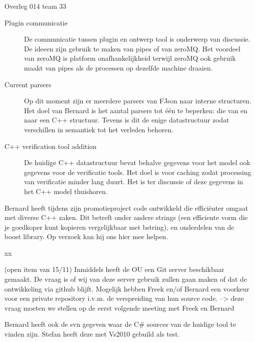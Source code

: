 \documentclass[a4paper,final]{article}
\begin{document}
\begin{Minutes}{Overleg 014 team 33}
\begin{description}
	\item[Plugin communicatie] De communicatie tussen plugin en ontwerp tool
		is onderwerp van discussie. De ideeen zijn gebruik te maken van pipes 
		of van zeroMQ. Het voordeel van zeroMQ is platform onafhankelijkheid
		terwijl zeroMQ ook gebruik maakt van pipes als de processen op dezelfde
		machine draaien.
	
	\item[Current parsers] Op dit moment zijn er meerdere parsers van FJson
		naar interne structuren. Het doel van Bernard is het aantal parsers tot
		\'e\'en te beperken: die van en naar een C++ structuur. Tevens is dit
		de enige datastructuur zodat verschillen in semantiek tot het verleden
		behoren.

	\item[C++ verification tool addition] De huidige C++ datastructuur bevat
		behalve gegevens voor het model ook gegevens voor de verificatie tools.
		Het doel is voor caching zodat processing van verificatie minder lang
		duurt.  Het is ter discussie of deze gegevens in het C++ model
		thuishoren.  

\end{description}



Bernard heeft tijdens zijn promotieproject code ontwikkeld die effici\"{e}nter
omgaat met diverse C++ zaken. Dit betreft onder andere strings (een efficiente
vorm die je goedkoper kunt kopieren vergelijkbaar met bstring), en onderdelen
van de boost library. Op verzoek kan hij ons hier mee helpen.

\subtopic{}

xx



(open item van 15/11)
Inmiddels heeft de OU een Git server beschikbaar gemaakt. De vraag is of wij van
deze server gebruik zullen gaan maken of dat de ontwikkeling via github blijft.
Mogelijk hebben Freek en/of Bernard een voorkeur voor een private repository i.v.m.
de verspreiding van hun source code.
--> deze vraag moeten we stellen op de eerst volgende meeting met Freek en Bernard

Bernard heeft ook de svn gegeven waar de C\# sources van de huidige tool te vinden
zijn. Stefan heeft deze met Vs2010 gebuild als test. 



\end{Minutes}
\end{document}
